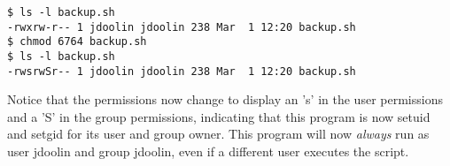 \begin{verbatim}
$ ls -l backup.sh
-rwxrw-r-- 1 jdoolin jdoolin 238 Mar  1 12:20 backup.sh
$ chmod 6764 backup.sh
$ ls -l backup.sh
-rwsrwSr-- 1 jdoolin jdoolin 238 Mar  1 12:20 backup.sh
\end{verbatim}

Notice that the permissions now change to display an 's' in the user permissions and a 'S' in the group permissions, indicating that this program is now setuid and setgid for its user and group owner.  This program will now \textit{always} run as user jdoolin and group jdoolin, even if a different user executes the script.

